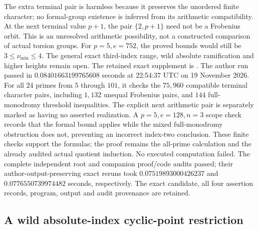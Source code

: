 \begin{remark}
\label{rem:B-RD75-scope}
The extra terminal pair is harmless because it preserves the
unordered finite character; no formal-group existence is
inferred from its arithmetic compatibility. At the next
terminal value \(p+1\), the pair \(\{2,p+1\}\) need not be
a Frobenius orbit. This is an unresolved arithmetic possibility,
not a constructed comparison of actual torsion groups.
For \(p=5,e=752\), the proved bounds would still be
\(3\le\nu_{\min}\le4\). The general exact third-index range,
wild absolute ramification and higher heights remain open.
The retained exact supplement is
.
The author run passed in \(0.08401663199765608\) seconds
at 22:54:37 UTC on 19 November 2026. For all \(24\) primes
from \(5\) through \(101\), it checks the \(75{,}960\)
compatible terminal character pairs, including \(1{,}132\)
unequal Frobenius pairs, and \(144\) full-monodromy threshold
inequalities. The explicit next arithmetic pair is separately
marked as having no asserted realization. A \(p=5,e=128,n=3\)
scope check records that the formal bound applies while the
mixed full-monodromy obstruction does not, preventing an
incorrect index-two conclusion. These finite checks support
the formulas; the proof remains the all-prime calculation
and the already audited actual quotient induction. No
executed computation failed.
The complete independent root and companion proof/code audits
passed; their author-output-preserving exact reruns took
\(0.07519893000426237\) and \(0.0776550739974482\) seconds,
respectively. The exact candidate, all four assertion records,
program, output and audit provenance are retained.
\end{remark}


\subsection{A wild absolute-index cyclic-point restriction}

